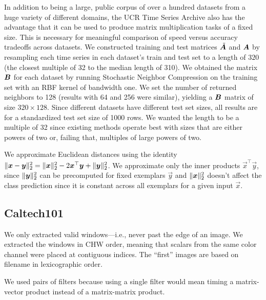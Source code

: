 In addition to being a large, public corpus of over a hundred datasets from a huge variety of different domains, the UCR Time Series Archive also has the advantage that it can be used to produce matrix multiplication tasks of a fixed size. This is necessary for meaningful comparison of speed versus accuracy tradeoffs across datasets. We constructed training and test matrices $\tilde{\bm{A}}$ and $\bm{A}$ by resampling each time series in each dataset's train and test set to a length of $320$ (the closest multiple of 32 to the median length of 310). We obtained the matrix $\bm{B}$ for each dataset by running Stochastic Neighbor Compression \cite{snc} on the training set with an RBF kernel of bandwidth one. We set the number of returned neighbors to 128 (results with 64 and 256 were similar), yielding a $\bm{B}$ matrix of size $320 \times 128$. %
Since different datasets have different test set sizes, all results are for a standardized test set size of 1000 rows. We wanted the length to be a multiple of 32 since existing methods operate best with sizes that are either powers of two or, failing that, multiples of large powers of two.

We approximate Euclidean distances using the identity $\lVert\bm{x} - \bm{y}\rVert_2^2 = \lVert\bm{x}\rVert_2^2 - 2\bm{x}^\top \bm{y} + \lVert\bm{y}\rVert_2^2$. We approximate only the inner products $\vec{x}^\top \vec{y}$, since $\lVert\bm{y}\rVert_2^2$ can be precomputed for fixed exemplars $\vec{y}$ and $\lVert\bm{x}\rVert_2^2$ doesn't affect the class prediction since it is constant across all exemplars for a given input $\vec{x}$.


\subsection{Caltech101}

We only extracted valid windows---i.e., never past the edge of an image. We extracted the windows in CHW order, meaning that scalars from the same color channel were placed at contiguous indices. The ``first'' images are based on filename in lexicographic order.

We used pairs of filters because using a single filter would mean timing a matrix-vector product instead of a matrix-matrix product.

